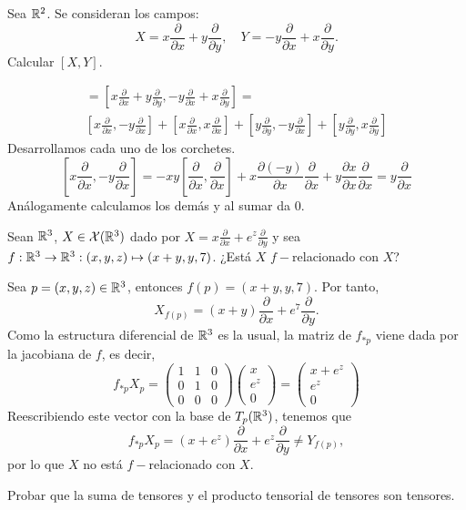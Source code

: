 \documentclass[twoside]{article}
\begin{document}
\begin{ejercicio}{3}
Sea $\mathbb{R}^2$. Se consideran los campos:
\[
X=x\frac{\partial}{\partial x}+y\frac{\partial}{\partial y},\quad Y=-y\frac{\partial}{\partial x}+x\frac{\partial}{\partial y}.
\]
Calcular $[X,Y]$.
\end{ejercicio}
\begin{solucion}
\begin{gather*}
[X,Y]=\left[x\frac{\partial}{\partial x}+y\frac{\partial}{\partial y}, -y\frac{\partial}{\partial x}+x\frac{\partial}{\partial y}\right]=\\
\left[x\frac{\partial}{\partial x},-y\frac{\partial}{\partial x}\right]+\left[x\frac{\partial}{\partial x},x\frac{\partial}{\partial x}\right]+\left[y\frac{\partial}{\partial y},-y\frac{\partial}{\partial x}\right]+\left[y\frac{\partial}{\partial y},x\frac{\partial}{\partial y}\right]
\end{gather*}
Desarrollamos cada uno de los corchetes.
\[
\left[x\frac{\partial}{\partial x},-y\frac{\partial}{\partial x}\right]=-xy\left[\frac{\partial}{\partial x},\frac{\partial}{\partial x}\right]+x\frac{
\partial (-y)}{\partial x}\frac{\partial}{\partial x}+y\frac{\partial x}{\partial x}\frac{\partial}{\partial x}=y\frac{\partial}{\partial x}
\]
Análogamente calculamos los demás y al sumar da 0.
\end{solucion}

\begin{ejercicio}{6}
Sean $\mathbb{R}^3$, $X \in \mathcal{X}(\mathbb{R}^3)$ dado por $X = x\frac{\partial}{\partial x} + e^z\frac{\partial}{\partial y}$ y sea $f :
\mathbb{R}^3 \to \mathbb{R}^3 : (x, y, z) \mapsto (x + y, y, 7)$. ¿Está $X$ $f-$relacionado con $X$?
\end{ejercicio}
\begin{solucion}
Sea $p=(x,y,z)\in\mathbb{R}^3$, entonces $f(p)=(x+y,y,7)$. Por tanto, $$X_{f(p)}=(x+y)\frac{\partial}{\partial x} + e^7\frac{\partial}{\partial y}.$$ %
Como la estructura diferencial de $\mathbb{R}^3$ es la usual, la matriz de $f_{*p}$ viene dada por la jacobiana de $f$, es decir, 
\[f_{*p}X_p=\begin{pmatrix}
1 & 1 & 0\\
0 & 1 & 0\\
0 & 0 & 0
\end{pmatrix}\begin{pmatrix}
x\\
e^z\\
0
\end{pmatrix}=\begin{pmatrix}
x+e^z\\
e^z\\
0
\end{pmatrix}\]
Reescribiendo este vector con la base de $T_p(\mathbb{R}^3)$, tenemos que 
$$f_{*p}X_p=(x+e^z)\frac{\partial}{\partial x} + e^z\frac{\partial}{\partial y}\neq Y_{f(p)},$$
por lo que $X$ no está $f-$relacionado con $X$.
\end{solucion}

\newpage

\begin{ejercicio}{}
Probar que la suma de tensores y el producto tensorial de tensores son tensores.
\end{ejercicio}
\begin{solucion}
\end{solucion}
\end{document}
